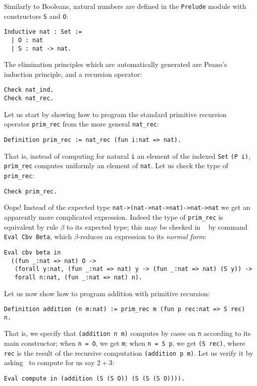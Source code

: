 \documentclass{book}
\begin{document}
Similarly to Booleans, natural numbers are defined in the \verb:Prelude:
module with constructors \verb:S: and \verb:O::
\begin{lstlisting}
Inductive nat : Set :=
  | O : nat
  | S : nat -> nat.
\end{lstlisting}

The elimination principles which are automatically generated are Peano's
induction principle, and a recursion operator:
\begin{lstlisting}
Check nat_ind.
Check nat_rec.
\end{lstlisting}

Let us start by showing how to program the standard primitive recursion
operator \verb:prim_rec: from the more general \verb:nat_rec::
\begin{lstlisting}
Definition prim_rec := nat_rec (fun i:nat => nat).
\end{lstlisting}

That is, instead of computing for natural \verb:i: an element of the indexed
\verb:Set: \verb:(P i):, \verb:prim_rec: computes uniformly an element of 
\verb:nat:. Let us check the type of \verb:prim_rec::
\begin{lstlisting}
Check prim_rec.
\end{lstlisting}

Oops! Instead of the expected type \verb+nat->(nat->nat->nat)->nat->nat+ we
get an apparently more complicated expression. Indeed the type of
\verb:prim_rec: is equivalent by rule $\beta$ to its expected type; this may
be checked in \Coq~ by command \verb:Eval Cbv Beta:, which $\beta$-reduces
an expression to its {\sl normal form}:
\begin{lstlisting}
Eval cbv beta in
  ((fun _:nat => nat) O ->
   (forall y:nat, (fun _:nat => nat) y -> (fun _:nat => nat) (S y)) ->
   forall n:nat, (fun _:nat => nat) n).
\end{lstlisting}

Let us now show how to program addition with primitive recursion:
\begin{lstlisting}
Definition addition (n m:nat) := prim_rec m (fun p rec:nat => S rec) n.
\end{lstlisting}

That is, we specify that \verb+(addition n m)+ computes by cases on \verb:n:
according to its main constructor; when \verb:n = O:, we get \verb:m:;
 when \verb:n = S p:, we get \verb:(S rec):, where \verb:rec: is the result
of the recursive computation \verb+(addition p m)+. Let us verify it by
asking \Coq~to compute for us say $2+3$:
\begin{lstlisting}
Eval compute in (addition (S (S O)) (S (S (S O)))).
\end{lstlisting}
\end{document}
